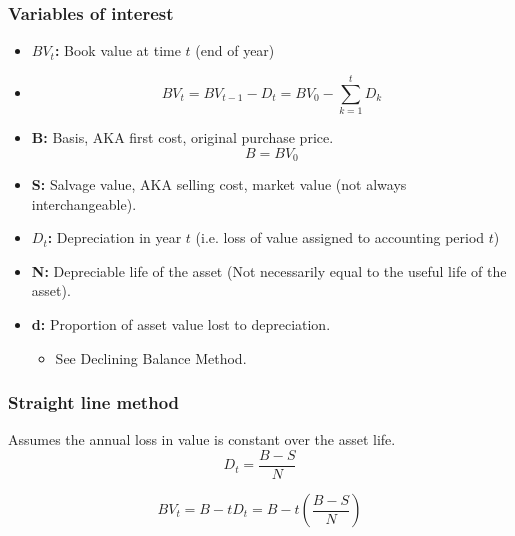 \subsubsection{Variables of interest}
\begin{definition}
    \begin{itemize}
        \item \textbf{$BV_t$:} Book value at time $t$ (end of year)
        \item 
        \begin{equation}
            BV_t = BV_{t-1} - D_t = BV_0 - \sum_{k=1}^{t} D_k
        \end{equation}
        
        \item \textbf{B:} Basis, AKA first cost, original purchase price.
            \[
            B = BV_0
            \]
        
        \item \textbf{S:} Salvage value, AKA selling cost, market value (not always interchangeable).
        
        \item \textbf{$D_t$:} Depreciation in year $t$ (i.e. loss of value assigned to accounting period $t$)
        
        \item \textbf{N:} Depreciable life of the asset (Not necessarily equal to the useful life of the asset).
        
        \item \textbf{d:} Proportion of asset value lost to depreciation.
            \begin{itemize}
                \item See Declining Balance Method.
            \end{itemize}
    \end{itemize}
\end{definition}

\subsubsection{Straight line method}
\begin{definition}
    Assumes the annual loss in value is constant over the asset life.
    \begin{equation}
        D_t = \frac{B - S}{N}
    \end{equation}

    \begin{equation}
        BV_t = B - tD_t = B - t\left(\frac{B - S}{N}\right)
    \end{equation}
\end{definition}

